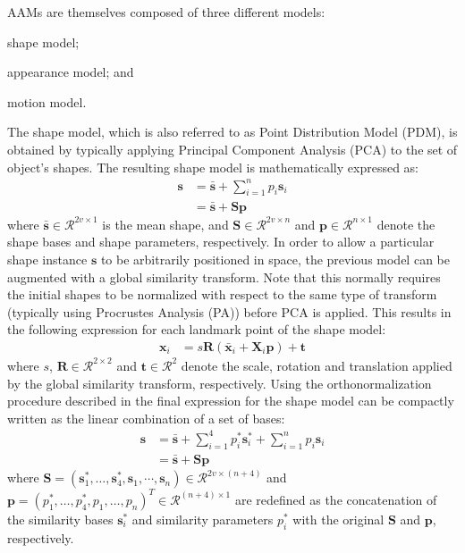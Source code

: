 AAMs are themselves composed of three different models:
\begin{inparaenum}[(i)]
	\item shape model; 
	\item appearance model; and
	\item motion model. 
\end{inparaenum} 

The shape model, which is also referred to as Point Distribution Model (PDM), is obtained by typically applying Principal Component Analysis (PCA) to the set of object's shapes. The resulting shape model is mathematically expressed as:
\begin{equation}
	\begin{aligned}
		\mathbf{s} & = \mathbf{\bar{s}} + \sum_{i=1}^n p_i \mathbf{s}_i 
        \\
        & = \mathbf{\bar{s}} + \mathbf{S} \mathbf{p}
	\end{aligned}
\end{equation}
where $\mathbf{\bar{s}} \in \mathcal{R}^{2v \times 1}$ is the mean shape, and $\mathbf{S} \in  \mathcal{R}^{2v \times  n}$ and $\mathbf{p} \in \mathcal{R}^{n \times 1}$ denote the shape bases and shape parameters, respectively. In order to allow a particular shape instance $\mathbf{s}$ to be arbitrarily positioned in space, the previous model can be augmented with a global similarity transform. Note that this normally requires the initial shapes to be normalized with respect to the same type of transform (typically using Procrustes Analysis (PA)) before PCA is applied. This results in the following expression for each landmark point of the shape model:
\begin{equation}
	\begin{aligned}
		\mathbf{x}_i & = s \mathbf{R} \left( \mathbf{\bar{x}}_i + \mathbf{X}_i \mathbf{p} \right) + \mathbf{t}
	\end{aligned}
\end{equation}
where $s$, $\mathbf{R} \in \mathcal{R}^{2 \times 2}$ and $\mathbf{t} \in \mathcal{R}^2$  denote the scale, rotation and translation applied by the global similarity transform, respectively. Using the orthonormalization procedure described in \cite{Matthews2004} the final expression for the shape model can be compactly written as the linear combination of a set of bases:
\begin{equation}
	\begin{aligned}
		\mathbf{s} & = \mathbf{\bar{s}} + \sum_{i=1}^4 p^*_i \mathbf{s}^*_i + \sum_{i=1}^n p_i \mathbf{s}_i 
        \\
        & = \mathbf{\bar{s}} + \mathbf{S} \mathbf{p}
	\end{aligned}
    \label{eq:shape_model}
\end{equation}
where $\mathbf{S} = (\mathbf{s}^*_1, \dots, \mathbf{s}^*_4, \mathbf{s}_1, \cdots, \mathbf{s}_n) \in \mathcal{R}^{2v \times (n+4)}$ and $\mathbf{p} = (p^*_1, \dots, p^*_4, p_1, \dots, p_n)^T \in \mathcal{R}^{(n+4) \times 1}$ are redefined as the concatenation of the similarity bases $\mathbf{s}^*_i$ and similarity parameters $p^*_i$ with the original $\mathbf{S}$ and $\mathbf{p}$, respectively.


